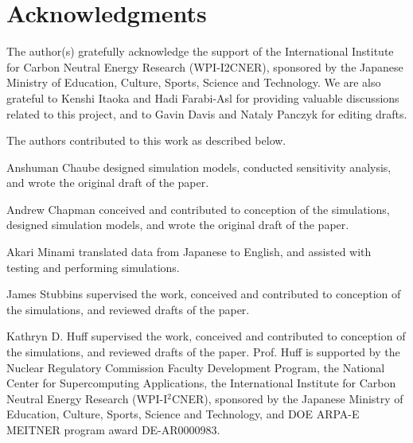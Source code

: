 \section{Acknowledgments}

The author(s) gratefully acknowledge the support of the International Institute for Carbon Neutral Energy Research (WPI-I2CNER), sponsored by the Japanese Ministry of Education, Culture, Sports, Science and Technology. We are also grateful to Kenshi Itaoka and Hadi Farabi-Asl for providing valuable discussions related to this project, and to Gavin Davis and Nataly Panczyk for editing drafts.

The authors contributed to this work as described below.

Anshuman Chaube designed simulation models, conducted sensitivity analysis, and wrote the original draft of the paper.

Andrew Chapman conceived and contributed to conception of the simulations, designed simulation models, and wrote the original draft of the paper. 

Akari Minami translated data from Japanese to English, and assisted with testing and performing simulations.

James Stubbins supervised the work, conceived and contributed to conception of the simulations, and reviewed drafts of the paper.

Kathryn D. Huff supervised the work, conceived and contributed to conception of the simulations, and reviewed drafts of the paper.  Prof. Huff is supported by the Nuclear Regulatory Commission Faculty Development Program, the National Center for Supercomputing Applications, the International Institute for Carbon Neutral Energy Research (WPI-I$^2$CNER), sponsored by the Japanese Ministry of Education, Culture, Sports, Science and Technology, and  DOE ARPA-E MEITNER program award DE-AR0000983.

